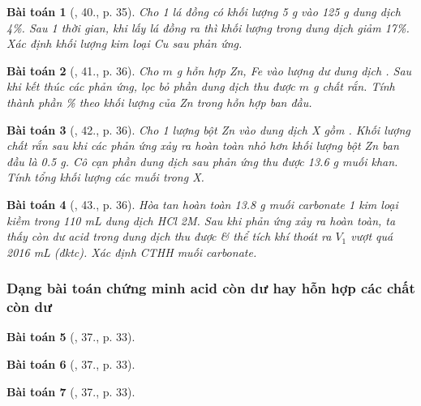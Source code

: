 \documentclass{article}
\newtheorem{baitoan}{Bài toán}
\begin{document}
\begin{baitoan}[\cite{An_350_BT_Hoa_Hoc_9}, 40., p. 35]
	Cho 1 lá đồng có khối lượng \emph{5 g} vào \emph{125 g} dung dịch \emph{ 4\%}. Sau 1 thời gian, khi lấy lá đồng ra thì khối lượng \emph{} trong dung dịch giảm \emph{17\%}. Xác định khối lượng kim loại \emph{Cu} sau phản ứng.
\end{baitoan}

\begin{baitoan}[\cite{An_350_BT_Hoa_Hoc_9}, 41., p. 36]
	Cho $m$ \emph{g} hỗn hợp \emph{Zn, Fe} vào lượng dư dung dịch \emph{}. Sau khi kết thúc các phản ứng, lọc bỏ phần dung dịch thu được $m$ \emph{g} chất rắn. Tính thành phần \% theo khối lượng của \emph{Zn} trong hỗn hợp ban đầu.
\end{baitoan}

\begin{baitoan}[\cite{An_350_BT_Hoa_Hoc_9}, 42., p. 36]
	Cho 1 lượng bột \emph{Zn} vào dung dịch X gồm \emph{}. Khối lượng chất rắn sau khi các phản ứng xảy ra hoàn toàn nhỏ hơn khối lượng bột \emph{Zn} ban đầu là \emph{0.5 g}. Cô cạn phần dung dịch sau phản ứng thu được \emph{13.6 g} muối khan. Tính tổng khối lượng các muối trong X.
\end{baitoan}

\begin{baitoan}[\cite{An_350_BT_Hoa_Hoc_9}, 43., p. 36]
	Hòa tan hoàn toàn \emph{13.8 g} muối carbonate 1 kim loại kiềm \emph{} trong \emph{110 mL} dung dịch \emph{HCl 2M}. Sau khi phản ứng xảy ra hoàn toàn, ta thấy còn dư acid trong dung dịch thu được \& thể tích khí thoát ra $V_1$ vượt quá \emph{2016 mL} (đktc). Xác định CTHH muối carbonate.
\end{baitoan}

\subsubsection{Dạng bài toán chứng minh acid còn dư hay hỗn hợp các chất còn dư}

\begin{baitoan}[\cite{An_350_BT_Hoa_Hoc_9}, 37., p. 33]
	
\end{baitoan}

\begin{baitoan}[\cite{An_350_BT_Hoa_Hoc_9}, 37., p. 33]
	
\end{baitoan}

\begin{baitoan}[\cite{An_350_BT_Hoa_Hoc_9}, 37., p. 33]
	
\end{baitoan}



\printbibliography[heading=bibintoc]
	
\end{document}

